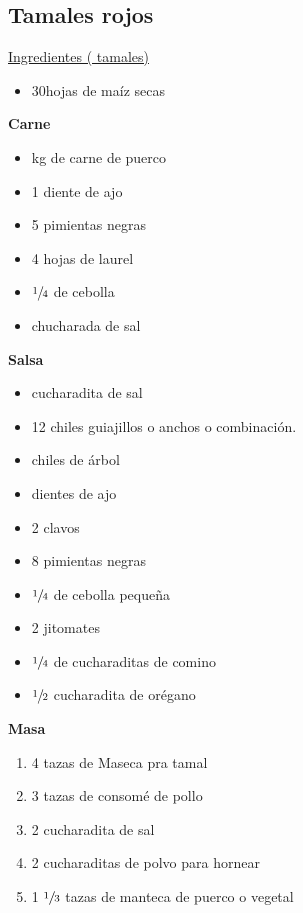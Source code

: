 \subsection{Tamales rojos}

\underline{Ingredientes ( tamales)}

\begin{itemize}
\item \Sim 30hojas de maíz secas
\end{itemize}

\textbf{Carne}
\begin{itemize}
\item {} kg de carne de puerco
\item 1 diente de ajo
\item 5 pimientas negras
\item 4 hojas de laurel
\item \Sim $\sfrac{1}{4}$ de cebolla
\item {} chucharada de sal
\end{itemize}

\textbf{Salsa}

\begin{itemize}
\item {} cucharadita de sal
\item 12 chiles guiajillos o anchos o combinación.
\item {} chiles de árbol
\item {} dientes de ajo
\item 2 clavos
\item 8 pimientas negras
\item \Sim $\sfrac{1}{4}$ de cebolla pequeña
\item 2 jitomates
\item $\sfrac{1}{4}$ de cucharaditas de comino
\item $\sfrac{1}{2}$ cucharadita de orégano
\end{itemize}

\textbf{Masa}

\begin{enumerate}
\item 4 tazas de Maseca pra tamal
\item 3 tazas de consomé de pollo
\item 2 cucharadita de sal
\item 2 cucharaditas de polvo para hornear
\item 1 $\sfrac{1}{3}$ tazas de manteca de puerco o vegetal
\end{enumerate}

